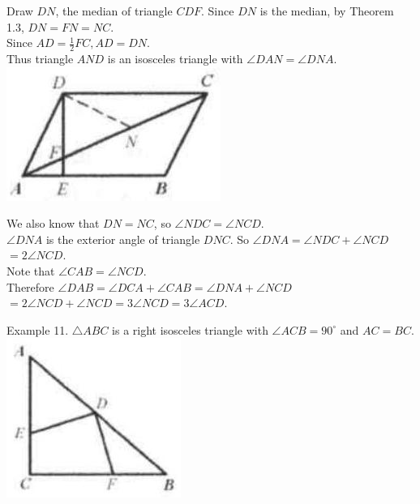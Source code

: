 \documentclass[10pt]{article}
\begin{document}
Draw \(D N\), the median of triangle \(C D F\). Since \(D N\) is the median, by Theorem 1.3, \(D N=F N=N C\).\\
Since \(A D=\frac{1}{2} F C, A D=D N\).\\
Thus triangle \(A N D\) is an isosceles triangle with \(\angle D A N=\angle D N A\).\\
\includegraphics[max width=\textwidth, center]{2025_04_17_97bc1f7e44d93c271a88g-012(2)}

We also know that \(D N=N C\), so \(\angle N D C=\angle N C D\).\\
\(\angle D N A\) is the exterior angle of triangle \(D N C\). So \(\angle D N A=\angle N D C+\angle N C D\)\\
\(=2 \angle N C D\).\\
Note that \(\angle C A B=\angle N C D\).\\
Therefore \(\angle D A B=\angle D C A+\angle C A B=\angle D N A+\angle N C D\)\\
\(=2 \angle N C D+\angle N C D=3 \angle N C D=3 \angle A C D\).

Example 11. \(\triangle A B C\) is a right isosceles triangle with \(\angle A C B=90^{\circ}\) and \(A C=B C\).\\
\includegraphics[max width=\textwidth, center]{2025_04_17_97bc1f7e44d93c271a88g-012(3)}
\end{document}
